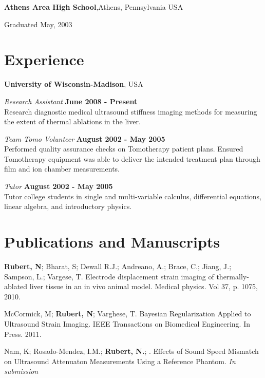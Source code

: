 \documentclass[margin,line]{res}
\newenvironment{list1}{
  \begin{list}{\ding{113}}{%
      \setlength{\itemsep}{0in}
      \setlength{\parsep}{0in} \setlength{\parskip}{0in}
      \setlength{\topsep}{0in} \setlength{\partopsep}{0in}
      \setlength{\leftmargin}{0.17in}}}{\end{list}}
\begin{document}
\begin{resume}
{\bf Athens Area High School},Athens, Pennsylvania USA\\
\vspace*{-.1in}
\begin{list1}
\item[] Graduated May, 2003
\end{list1}

\section{\sc Experience}

{\bf University of Wisconsin-Madison}, USA

\vspace{-.3cm}
{\em Research Assistant} \hfill {\bf June 2008 - Present} \\
Research diagnostic medical ultrasound stiffness imaging methods for measuring the extent of thermal ablations in the liver.

\vspace{-.3cm}
{\em Team Tomo Volunteer} \hfill {\bf August 2002 - May 2005} \\
Performed quality assurance checks on Tomotherapy patient plans.  Ensured Tomotherapy equipment was able to deliver the intended 
treatment plan through film and ion chamber measurements.

\vspace{-.3cm}
{\em Tutor} \hfill {\bf August 2002 - May 2005} \\
Tutor college students in single and multi-variable calculus, differential equations, linear algebra, and introductory physics.


\section{\sc Publications and Manuscripts}

{\bf Rubert, N}; Bharat, S; Dewall R.J.; Andreano, A.; Brace, C.; Jiang, J.; Sampson, L.; Vargese, T.  Electrode displacement strain imaging of thermally-ablated liver tissue in an in vivo animal model.  Medical physics. Vol 37, p. 1075, 2010.

McCormick, M; {\bf Rubert, N}; Varghese, T. Bayesian Regularization Applied to
Ultrasound Strain Imaging. IEEE Transactions on Biomedical Engineering.
In Press. 2011.

Nam, K; Rosado-Mendez, I.M.; {\bf Rubert, N.}; .  Effects of Sound Speed Mismatch on Ultrasound Attenuaton Measurements Using a Reference Phantom.  	{\it In submission}


\end{resume}
\end{document}
